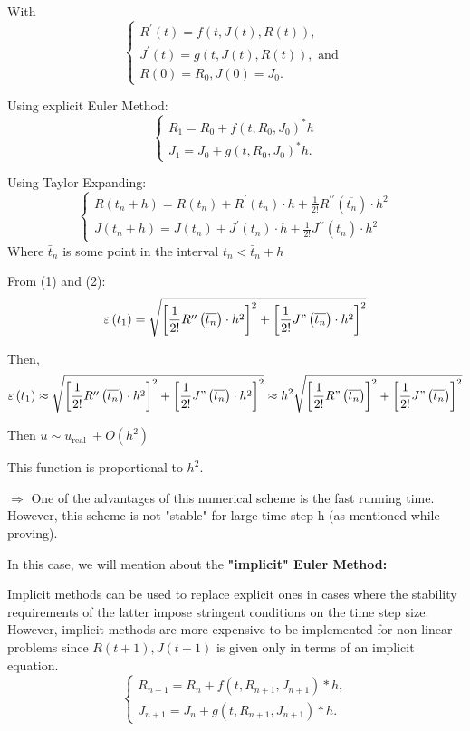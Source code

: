 \documentclass[a4paper]{article}
\begin{document}
With
$$
\left\{\begin{array}{l}
	R^{\prime}(t)=f(t, J(t), R(t)), \\
	J^{\prime}(t)=g(t, J(t), R(t)), \text { and } \\
	R(0)=R_{0}, J(0)=J_{0} .
\end{array}\right.
$$

Using explicit Euler Method:
$$
\left\{\begin{array}{l}
	R_{1}=R_{0}+f\left(t, R_{0}, J_{0}\right)^{*} h \\
	J_{1}=J_{0}+g\left(t, R_{0}, J_{0}\right)^{*} h .
\end{array}\right.
$$

Using Taylor Expanding:
$$
\left\{\begin{array}{l}
	R\left(t_{n}+h\right)=R\left(t_{n}\right)+R^{\prime}\left(t_{n}\right) \cdot h+\frac{1}{2 !} R^{\prime \prime}\left(\overline{t_{n}}\right) \cdot h^{2} \\
	J\left(t_{n}+h\right)=J\left(t_{n}\right)+J^{\prime}\left(t_{n}\right) \cdot h+\frac{1}{2 !} J{ }^{\prime \prime}\left(\overline{t_{n}}\right) \cdot h^{2}
\end{array}\right.
$$
Where $\bar{t}_{n}$ is some point in the interval $t_{n}<\bar{t}_{n}+h$

From (1) and (2):
$$
\varepsilon\left(t_{1}\right)=\sqrt{\left[\frac{1}{2 !} R^{\prime \prime}\left(\overline{t_{n}}\right) \cdot h^{2}\right]^{2}+\left[\frac{1}{2 !} J "\left(\overline{t_{n}}\right) \cdot h^{2}\right]^{2}}
$$

Then,
$$
\varepsilon\left(t_{1}\right) \approx \sqrt{\left[\frac{1}{2 !} R^{\prime \prime}\left(\overline{t_{n}}\right) \cdot h^{2}\right]^{2}+\left[\frac{1}{2 !} J "\left(\overline{t_{n}}\right) \cdot h^{2}\right]^{2}} \approx h^{2} \sqrt{\left[\frac{1}{2 !} R "\left(\overline{t_{n}}\right)\right]^{2}+\left[\frac{1}{2 !} J "\left(\overline{t_{n}}\right)\right]^{2}}
$$

Then $u \sim u_{\text {real }}+O\left(h^{2}\right)$

This function is proportional to $h^{2}$.

$\Rightarrow$ One of the advantages of this numerical scheme is the fast running time. However, this scheme is not "stable" for large time step $\mathrm{h}$ (as mentioned while proving).

In this case, we will mention about the \textbf{"implicit" Euler Method:}

Implicit methods can be used to replace explicit ones in cases where the stability requirements of the latter impose stringent conditions on the time step size. However, implicit methods are more expensive to be implemented for non-linear problems since $R(t+1), J(t+1)$ is given only in terms of an implicit equation.
$$
\left\{\begin{array}{l}
	R_{n+1}=R_{n}+f\left(t, R_{n+1}, J_{n+1}\right) * h, \\
	J_{n+1}=J_{n}+g\left(t, R_{n+1}, J_{n+1}\right) * h .
\end{array}\right.
$$
\end{document}
